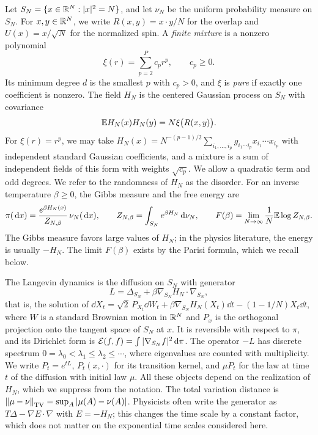 Let $S_N=\{x\in\mathbb R^N:|x|^2=N\}$, and let $\nu_N$ be the uniform probability measure on $S_N$. For $x,y\in\mathbb R^N$, we write $R(x,y)=x\cdot y/N$ for the overlap and $U(x)=x/\sqrt N$ for the normalized spin. A \emph{finite mixture} is a nonzero polynomial
\begin{equation*}
\xi(r)=\sum_{p=2}^Pc_pr^p,\qquad c_p\ge0.
\end{equation*}
Its minimum degree $d$ is the smallest $p$ with $c_p>0$, and $\xi$ is \emph{pure} if exactly one coefficient is nonzero. The field $H_N$ is the centered Gaussian process on $S_N$ with covariance
\begin{equation*}
\mathbb E H_N(x)H_N(y)=N\xi\bigl(R(x,y)\bigr).
\end{equation*}
For $\xi(r)=r^p$, we may take $H_N(x)=N^{-(p-1)/2}\sum_{i_1,\dots,i_p}g_{i_1\cdots i_p}x_{i_1}\cdots x_{i_p}$ with independent standard Gaussian coefficients, and a mixture is a sum of independent fields of this form with weights $\sqrt{c_p}$. We allow a quadratic term and odd degrees. We refer to the randomness of $H_N$ as the disorder. For an inverse temperature $\beta\ge0$, the Gibbs measure and the free energy are
\begin{equation*}
\pi(\,\mathrm d x)=\frac{e^{\beta H_N(x)}}{Z_{N,\beta}}\,\nu_N(\,\mathrm d x),\qquad Z_{N,\beta}=\int_{S_N}e^{\beta H_N}\,\mathrm d\nu_N,\qquad F(\beta)=\lim_{N\to\infty}\frac1N\mathbb E\log Z_{N,\beta}.
\end{equation*}
The Gibbs measure favors large values of $H_N$; in the physics literature, the energy is usually $-H_N$. The limit $F(\beta)$ exists by the Parisi formula, which we recall below.

The Langevin dynamics is the diffusion on $S_N$ with generator
\begin{equation*}
L=\Delta_{S_N}+\beta\nabla_{S_N}H_N\cdot\nabla_{S_N},
\end{equation*}
that is, the solution of $\dd X_t=\sqrt2\,P_{X_t}\dd W_t+\beta\nabla_{S_N}H_N(X_t)\dd t-(1-1/N)X_t\dd t$, where $W$ is a standard Brownian motion in $\mathbb R^N$ and $P_x$ is the orthogonal projection onto the tangent space of $S_N$ at $x$. It is reversible with respect to $\pi$, and its Dirichlet form is $\mathcal E(f,f)=\int|\nabla_{S_N}f|^2\,\mathrm d\pi$. The operator $-L$ has discrete spectrum $0=\lambda_0<\lambda_1\le\lambda_2\le\cdots$, where eigenvalues are counted with multiplicity. We write $P_t=e^{tL}$, $P_t(x,\cdot)$ for its transition kernel, and $\mu P_t$ for the law at time $t$ of the diffusion with initial law $\mu$. All these objects depend on the realization of $H_N$, which we suppress from the notation. The total variation distance is $\left\lVert\mu-\nu\right\rVert_{\mathrm{TV}}=\sup_A|\mu(A)-\nu(A)|$. Physicists often write the generator as $T\Delta-\nabla E\cdot\nabla$ with $E=-H_N$; this changes the time scale by a constant factor, which does not matter on the exponential time scales considered here.

